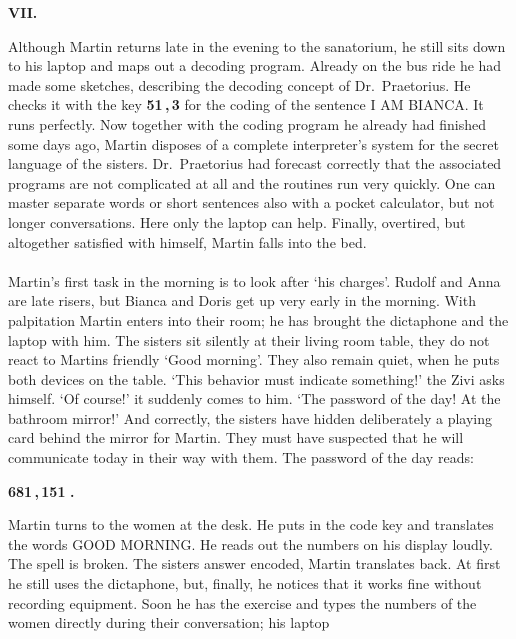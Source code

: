
\begin{center} 
{\bf VII.} 
\end{center} 
Although Martin returns late in the evening to the sanatorium, he still sits down to his laptop and 
maps out a decoding program. 
Already on the bus ride he had made some sketches, describing the decoding concept of Dr.~Praetorius. 
He checks it with the key {\bf 51\,,\,3} for the coding of the sentence I AM BIANCA. 
It runs perfectly. 
Now together with the coding program he already had finished some days ago, Martin disposes of a complete 
interpreter's system for the secret language of the sisters. 
Dr.~Praetorius had forecast correctly that the associated programs are not complicated at all and the 
routines run very quickly. 
One can master separate words or short sentences also with a pocket calculator, but not longer conversations.
Here only the laptop can help. 
Finally, overtired, but altogether satisfied with himself, Martin falls into the bed. \\ \\ 
Martin's first task in the morning is to look after `his charges'. 
Rudolf and Anna are late risers, but Bianca and Doris get up very early in the morning. 
With palpitation Martin enters into their room; he has brought the dictaphone and the laptop with him. 
The sisters sit silently at their living room table, they do not react to Martins friendly `Good morning'. 
They also remain quiet, when he puts both devices on the table.
`This behavior must indicate something!' the Zivi asks himself. `Of course!' it suddenly comes to him. 
`The password of the day! At the bathroom mirror!' 
And correctly, the sisters have hidden deliberately a playing card behind the mirror for Martin. 
They must have suspected that he will communicate today in their way with them. 
The password of the day reads: 
\begin{center} 
{\bf 681\,,\,151\,\,.}
\end{center} 
Martin turns to the women at the desk. 
He puts in the code key and translates the words GOOD MORNING. 
He reads out the numbers on his display loudly. 
The spell is broken. 
The sisters answer encoded, Martin translates back. 
At first he still uses the dictaphone, but, finally, he notices that it works fine without recording equipment. 
Soon he has the exercise and types the numbers of the women directly during their conversation; his laptop 
